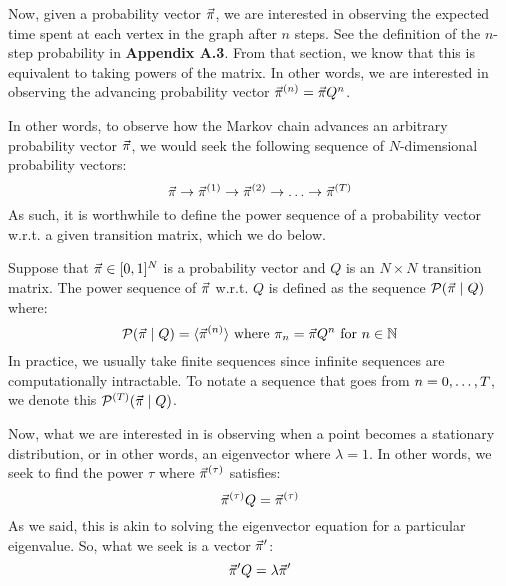 Now, given a probability vector $\vec{\pi}$, we are interested in observing the expected time spent at each vertex in the graph after $n$ steps.
See the definition of the $n$-step probability in \textbf{Appendix A.3}. From that section, we know that this is equivalent to taking powers of the matrix.
In other words, we are interested in observing the advancing probability vector $\vec{\pi}^{(n)} = \vec{\pi} Q^n$.

In other words, to observe how the Markov chain advances an arbitrary probability vector $\vec{\pi}$, we would seek the following sequence of $N$-dimensional probability vectors:
$$\pivec \ra \pivecn{1} \ra \pivec^{(2)} \ra \dots \ra \pivec^{(\maxtime)}$$
As such, it is worthwhile to define the power sequence of a probability vector w.r.t. a given transition matrix, which we do below.

\begin{definition}
Suppose that $\vec{\pi} \in [0,1]^N$ is a probability vector and $Q$ is an $N \times N$ transition matrix.
The power sequence of $\vec{\pi}$ w.r.t. $Q$ is defined as the sequence $\mathcal{P}(\vec{\pi} \mid Q)$ where:
$$\mathcal{P}(\vec{\pi} \mid Q) = \langle \vec{\pi}^{(n)} \rangle \text{ where } \pi_n = \vec{\pi} Q^n \text{ for } {n \in \mathbb{N}}$$
In practice, we usually take finite sequences since infinite sequences are computationally intractable.
To notate a sequence that goes from $n = 0, \dots, T$, we denote this $\mathcal{P}^{(T)}(\vec{\pi} \mid Q)$.
\end{definition}



%
%
%
%
%
%
%
%
%



Now, what we are interested in is observing when a point becomes a stationary distribution, or in other words, an eigenvector where $\lambda = 1$.
In other words, we seek to find the power $\tau$ where $\vec{\pi}^{(\tau)}$ satisfies:
$$ \vec{\pi}^{(\tau)}Q = \vec{\pi}^{(\tau)} $$
As we said, this is akin to solving the eigenvector equation for a particular eigenvalue. So, what we seek is a vector $\vec{\pi}'$:
$$ \vec{\pi}'Q = \lambda \vec{\pi}' $$

